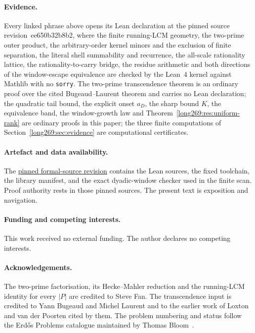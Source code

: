 \documentclass[11pt]{article}
\renewcommand{\commitshort}{ee650b32b8b2}
\begin{document}
\paragraph{Evidence.}  Every linked phrase above opens its Lean declaration at
the pinned source revision~\commitshort, where the finite running-LCM geometry,
the two-prime outer product, the arbitrary-order kernel minors and the
exclusion of finite separation, the literal shell summability and recurrence,
the all-scale rationality lattice, the rationality-to-carry bridge, the residue
arithmetic and both directions of the window-escape equivalence are checked by
the Lean~4 kernel against Mathlib with no \texttt{sorry}.  The two-prime
transcendence theorem is an ordinary proof over the cited Bugeaud--Laurent
theorem and carries no Lean declaration; the quadratic tail bound, the explicit
onset $a_D$, the sharp bound $K$, the equivalence band, the window-growth law
and Theorem~\ref{long269:res:uniform-rank} are ordinary proofs in this paper; the three
finite computations of Section~\ref{long269:sec:evidence} are computational
certificates.

\paragraph{Artefact and data availability.} The
\href{\sourceurl}{pinned formal-source revision} contains the Lean sources, the
fixed toolchain, the library manifest, and the exact dyadic-window checker used
in the finite scan.  Proof authority rests in those pinned sources.  The
present text is exposition and navigation.

\paragraph{Funding and competing interests.} This work received no external
funding.  The author declares no competing interests.

\paragraph{Acknowledgements.} The two-prime factorisation, its Hecke--Mahler
reduction and the running-LCM identity for every $|P|$ are credited to Steve
Fan.  The transcendence input is credited to Yann Bugeaud and Michel Laurent
and to the earlier work of Loxton and van der Poorten cited by them.  The
problem numbering and status follow the Erd\H{o}s Problems catalogue maintained
by Thomas Bloom~\cite{erdosproblems}.
\end{document}
